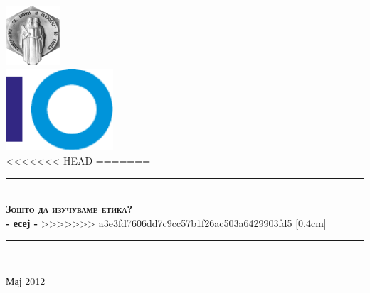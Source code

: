 \begin{titlepage}
\begin{center}
\newcommand{\HRule}{\rule{\linewidth}{0.5mm}}

\includegraphics[width=0.15\textwidth]{images/ukim}\\[1cm]

\includegraphics[width=0.3\textwidth]{images/finki_logo}\\[1cm]

<<<<<<< HEAD
=======
\HRule \\[0.4cm]
{  \bfseries \textsc{Зошто да изучуваме етика?}\\[0.4cm] - есеј
-}
>>>>>>> a3e3fd7606dd7c9cc57b1f26ac503a6429903fd5
\vfill
\vfill
[0.4cm]

\HRule \\[1.5cm]

\begin{minipage}{0.45\textwidth}
\begin{flushleft} 
\end{flushleft}
\end{minipage}
\begin{minipage}{0.45\textwidth}
\begin{flushright} 
\end{flushright}
\end{minipage}

\vfill

{\large Мај 2012}

\end{center}
\end{titlepage}